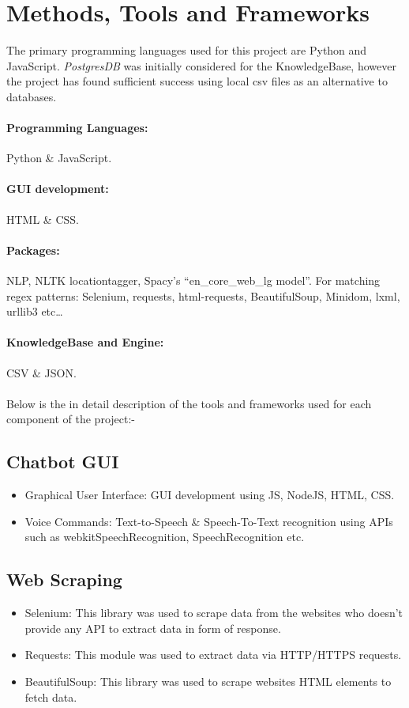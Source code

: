 \section{Methods, Tools and Frameworks}

The primary programming languages used for this project are Python and JavaScript. \textit{PostgresDB} was initially considered for the KnowledgeBase, however the project has found sufficient success using local csv files as an alternative to databases.

\paragraph{Programming Languages:} Python \& JavaScript.
\paragraph{GUI development:} HTML \& CSS.
\paragraph{Packages:} NLP, NLTK locationtagger\citep{NLTK}, Spacy's ``en\_core\_web\_lg model''. For matching regex patterns: Selenium, requests, html-requests, BeautifulSoup, Minidom, lxml, urllib3 etc\dots %
\paragraph{KnowledgeBase and Engine:} CSV \& JSON.\\
\noindent
\\Below is the in detail description of the tools and frameworks used for each component of the project:-
\subsection{Chatbot GUI}
\begin{itemize}
    \item Graphical User Interface: GUI development using JS, NodeJS, HTML, CSS.
    \item Voice Commands: Text-to-Speech \& Speech-To-Text recognition using APIs such as webkitSpeechRecognition, SpeechRecognition etc. 
\end{itemize}
\subsection{Web Scraping}
\begin{itemize}
    \item Selenium: This library was used to scrape data from the websites who doesn't provide any API to extract data in form of response.
    \item Requests: This module was used to extract data via HTTP/HTTPS requests.
    \item BeautifulSoup: This library was used to scrape websites HTML elements to fetch data.
\end{itemize}
